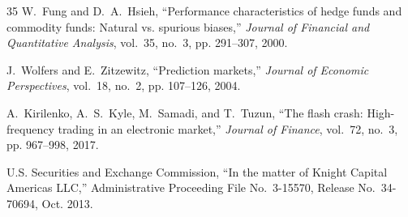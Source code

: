 \documentclass[10pt,twocolumn]{IEEEtran}
\begin{document}
\begin{thebibliography}{35}
W.~Fung and D.~A.~Hsieh, ``Performance characteristics of hedge funds and
commodity funds: Natural vs. spurious biases,'' \emph{Journal of Financial and
Quantitative Analysis}, vol.~35, no.~3, pp. 291--307, 2000.

J.~Wolfers and E.~Zitzewitz, ``Prediction markets,'' \emph{Journal of Economic
Perspectives}, vol.~18, no.~2, pp. 107--126, 2004.

A.~Kirilenko, A.~S.~Kyle, M.~Samadi, and T.~Tuzun, ``The flash crash:
High-frequency trading in an electronic market,'' \emph{Journal of Finance},
vol.~72, no.~3, pp. 967--998, 2017.

U.S. Securities and Exchange Commission, ``In the matter of Knight Capital
Americas LLC,'' Administrative Proceeding File No.~3-15570, Release
No.~34-70694, Oct. 2013.

\end{thebibliography}
\end{document}
